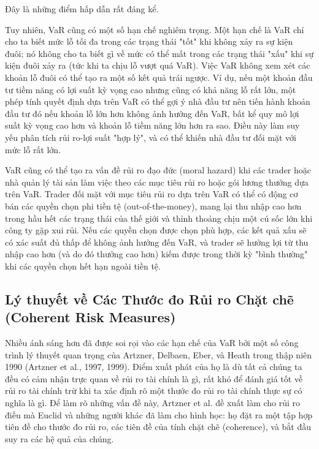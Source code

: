 Đây là những điểm hấp dẫn rất đáng kể.

Tuy nhiên, VaR cũng có một số hạn chế nghiêm trọng. Một hạn chế là VaR chỉ cho ta biết mức lỗ tối đa trong các trạng thái "tốt" khi không xảy ra sự kiện đuôi; nó không cho ta biết gì về mức có thể mất trong các trạng thái "xấu" khi sự kiện đuôi xảy ra (tức khi ta chịu lỗ vượt quá VaR). Việc VaR không xem xét các khoản lỗ đuôi có thể tạo ra một số kết quả trái ngược. Ví dụ, nếu một khoản đầu tư tiềm năng có lợi suất kỳ vọng cao nhưng cũng có khả năng lỗ rất lớn, một phép tính quyết định dựa trên VaR có thể gợi ý nhà đầu tư nên tiến hành khoản đầu tư đó nếu khoản lỗ lớn hơn không ảnh hưởng đến VaR, bất kể quy mô lợi suất kỳ vọng cao hơn và khoản lỗ tiềm năng lớn hơn ra sao. Điều này làm suy yếu phân tích rủi ro-lợi suất "hợp lý", và có thể khiến nhà đầu tư đối mặt với mức lỗ rất lớn.

VaR cũng có thể tạo ra vấn đề rủi ro đạo đức (moral hazard) khi các trader hoặc nhà quản lý tài sản làm việc theo các mục tiêu rủi ro hoặc gói lương thưởng dựa trên VaR. Trader đối mặt với mục tiêu rủi ro dựa trên VaR có thể có động cơ bán các quyền chọn phi tiền tệ (out-of-the-money), mang lại thu nhập cao hơn trong hầu hết các trạng thái của thế giới và thỉnh thoảng chịu một cú sốc lớn khi công ty gặp xui rủi. Nếu các quyền chọn được chọn phù hợp, các kết quả xấu sẽ có xác suất đủ thấp để không ảnh hưởng đến VaR, và trader sẽ hưởng lợi từ thu nhập cao hơn (và do đó thưởng cao hơn) kiếm được trong thời kỳ "bình thường" khi các quyền chọn hết hạn ngoài tiền tệ.

\subsection{Lý thuyết về Các Thước đo Rủi ro Chặt chẽ (Coherent Risk Measures)}

Nhiều ánh sáng hơn đã được soi rọi vào các hạn chế của VaR bởi một số công trình lý thuyết quan trọng của Artzner, Delbaen, Eber, và Heath trong thập niên 1990 (Artzner et al., 1997, 1999). Điểm xuất phát của họ là dù tất cả chúng ta đều có cảm nhận trực quan về rủi ro tài chính là gì, rất khó để đánh giá tốt về rủi ro tài chính trừ khi ta xác định rõ một thước đo rủi ro tài chính thực sự có nghĩa là gì. Để làm rõ những vấn đề này, Artzner et al. đề xuất làm cho rủi ro điều mà Euclid và những người khác đã làm cho hình học: họ đặt ra một tập hợp tiên đề cho thước đo rủi ro, các tiên đề của tính chặt chẽ (coherence), và bắt đầu suy ra các hệ quả của chúng.

